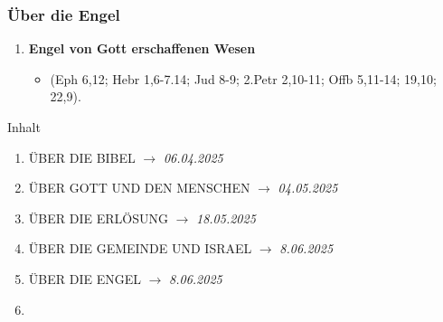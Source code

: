 \documentclass[aspectratio=43]{beamer}
\begin{document}
\begin{frame}
    \frametitle{Über die Engel}  %
    \vspace{0.80cm}
    \begin{enumerate}
        \item \textbf{Engel von Gott erschaffenen Wesen}
            \begin{itemize}              
                \item (Eph 6,12; Hebr 1,6-7.14; Jud 8-9; 2.Petr 2,10-11; Offb 5,11-14; 19,10; 22,9).  
            \end{itemize}  
    \end{enumerate}   
\end{frame}
\begin{frame}{Inhalt}
    \begin{enumerate}
        \item \uppercase{über die bibel} $\longrightarrow$ \textit{06.04.2025}
        \item \uppercase{über gott und den Menschen} $\longrightarrow$ \textit{04.05.2025}
        \item \uppercase{über die Erlösung} $\longrightarrow$ \textit{18.05.2025}
        \item \uppercase{über die Gemeinde und Israel} $\longrightarrow$ \textit{8.06.2025}
        \item \uppercase{über die Engel} $\longrightarrow$ \textit{8.06.2025}
        \item {}
    \end{enumerate}
\end{frame}
\end{document}
